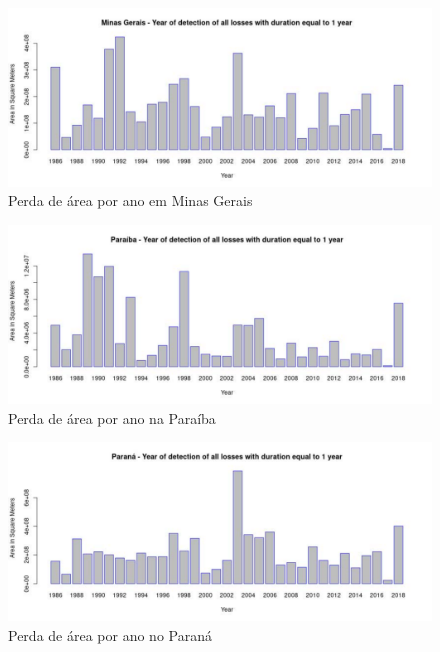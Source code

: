 \begin{figure}[H]
    \centering
    \includegraphics[scale=.5]{images/loss_graphics/Minas Gerais_loss_eq1.pdf}
    \caption{Perda de área por ano em Minas Gerais}
    \label{fig:loss_minas_gerais}
\end{figure}

\begin{figure}[H]
    \centering
    \includegraphics[scale=.5]{images/loss_graphics/Paraiba_loss_eq1.pdf}
    \caption{Perda de área por ano na Paraíba}
    \label{fig:loss_paraiba}
\end{figure}

\begin{figure}[H]
    \centering
    \includegraphics[scale=.5]{images/loss_graphics/Parana_loss_eq1.pdf}
    \caption{Perda de área por ano no Paraná}
    \label{fig:loss_parana}
\end{figure}

